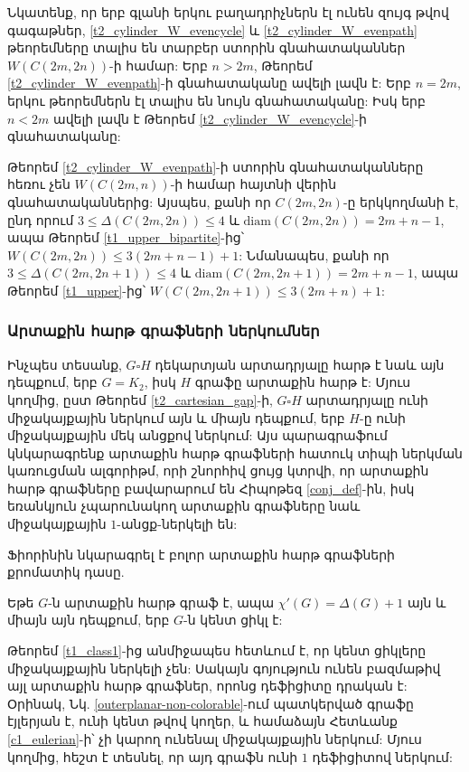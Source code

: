 Նկատենք, որ երբ գլանի երկու բաղադրիչներն էլ ունեն զույգ թվով գագաթներ, \ref{t2_cylinder_W_evencycle} և \ref{t2_cylinder_W_evenpath} թեորեմները տալիս են տարբեր ստորին գնահատականներ $W\left(C(2m,2n)\right)$-ի համար: Երբ $n>2m$, Թեորեմ \ref{t2_cylinder_W_evenpath}-ի գնահատականը ավելի լավն է: Երբ $n=2m$, երկու թեորեմներն էլ տալիս են նույն գնահատականը: Իսկ երբ $n<2m$ ավելի լավն է Թեորեմ \ref{t2_cylinder_W_evencycle}-ի գնահատականը:

Թեորեմ \ref{t2_cylinder_W_evenpath}-ի ստորին գնահատականները հեռու չեն $W\left(C(2m,n)\right)$-ի համար հայտնի վերին գնահատականներից: Այսպես, քանի որ $C(2m,2n)$-ը երկկողմանի է, ընդ որում $3\leq \Delta\left(C(2m,2n)\right)\leq 4$ և $\mathrm{diam}\left(C(2m,2n)\right)=2m+n-1$, ապա Թեորեմ \ref{t1_upper_bipartite}-ից՝ $W\left(C(2m,2n)\right)\leq 3(2m+n-1)+1$: Նմանապես, քանի որ $3\leq \Delta\left(C(2m,2n+1)\right)\leq 4$ և $\mathrm{diam}\left(C(2m,2n+1)\right)=2m+n-1$, ապա Թեորեմ \ref{t1_upper}-ից՝ $W\left(C(2m,2n+1)\right)\leq 3(2m+n)+1$:


\subsubsection{Արտաքին հարթ գրաֆների ներկումներ}
\label{section_outerplanar}
Ինչպես տեսանք, $G\square H$ դեկարտյան արտադրյալը հարթ է նաև այն դեպքում, երբ $G=K_2$, իսկ $H$ գրաֆը արտաքին հարթ է: Մյուս կողմից, ըստ Թեորեմ \ref{t2_cartesian_gap}-ի, $G \square H$ արտադրյալը ունի միջակայքային ներկում այն և միայն դեպքում, երբ $H$-ը ունի միջակայքային մեկ անցքով ներկում: Այս պարագրաֆում կնկարագրենք արտաքին հարթ գրաֆների հատուկ տիպի ներկման կառուցման ալգորիթմ, որի շնորհիվ ցույց կտրվի, որ արտաքին հարթ գրաֆները բավարարում են Հիպոթեզ \ref{conj_def}-ին, իսկ եռանկյուն չպարունակող արտաքին գրաֆները նաև միջակայքային $1$-անցք-ներկելի են:

Ֆիորինին \cite{Fiorini1975} նկարագրել է բոլոր արտաքին հարթ գրաֆների քրոմատիկ դասը.
\begin{theorem}
Եթե $G$-ն արտաքին հարթ գրաֆ է, ապա $\chi'(G)=\Delta(G) + 1$ այն և միայն այն դեպքում, երբ $G$-ն կենտ ցիկլ է:
\end{theorem}

Թեորեմ \ref{t1_class1}-ից անմիջապես հետևում է, որ կենտ ցիկլերը միջակայքային ներկելի չեն: Սակայն գոյություն ունեն բազմաթիվ այլ արտաքին հարթ գրաֆներ, որոնց դեֆիցիտը դրական է: Օրինակ, Նկ. \ref{outerplanar-non-colorable}-ում պատկերված գրաֆը էյլերյան է, ունի կենտ թվով կողեր, և համաձայն Հետևանք \ref{c1_eulerian}-ի՝ չի կարող ունենալ միջակայքային ներկում: Մյուս կողմից, հեշտ է տեսնել, որ այդ գրաֆն ունի $1$ դեֆիցիտով ներկում:

